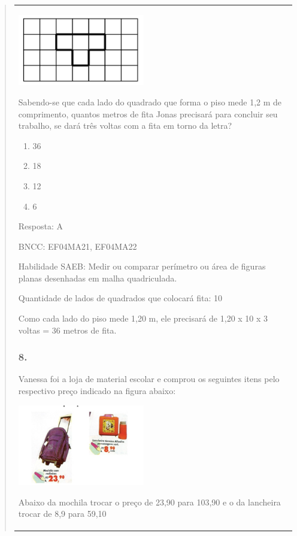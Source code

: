 \begin{enumerate}
\begin{escolha}
\begin{enumerate}
\begin{itemize}
\begin{itemize}
\begin{escolha}
\begin{quote}
\begin{escolha}
{\begin{longtable}[]{@{}l@{}}
\begin{itemize}
\includegraphics[width=2.17519in,height=1.22511in]{media/image155.png}

Sabendo-se que cada lado do quadrado que forma o piso mede 1,2 m de
comprimento, quantos metros de fita Jonas precisará para concluir seu
trabalho, se dará três voltas com a fita em torno da letra?

\begin{enumerate}
\def\labelenumi{\alph{enumi})}
\item
  36
\item
  18
\item
  12
\item
  6
\end{enumerate}

Resposta: A

BNCC: EF04MA21, EF04MA22

Habilidade SAEB: Medir ou comparar perímetro ou área de figuras planas
desenhadas em malha quadriculada.

Quantidade de lados de quadrados que colocará fita: 10

Como cada lado do piso mede 1,20 m, ele precisará de 1,20 x 10 x 3
voltas = 36 metros de fita.

\subsubsection{8.}\label{section-164}

Vanessa foi a loja de material escolar e comprou os seguintes itens pelo
respectivo preço indicado na figura abaixo:

\includegraphics[width=2.17519in,height=1.39179in]{media/image156.png}

Abaixo da mochila trocar o preço de 23,90 para 103,90 e o da lancheira
trocar de 8,9 para 59,10


\end{itemize}
\end{longtable}}
\end{escolha}
\end{quote}
\end{escolha}
\end{itemize}
\end{itemize}
\end{enumerate}
\end{escolha}
\end{enumerate}
